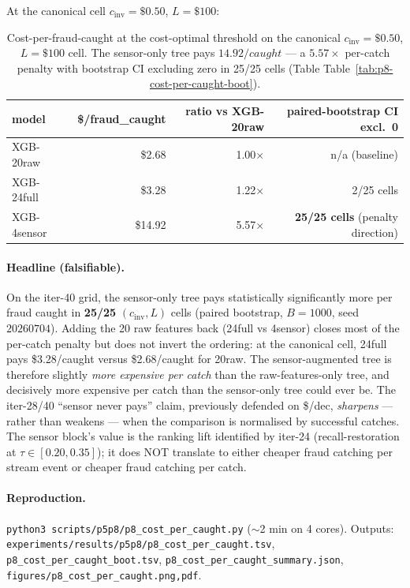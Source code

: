 \documentclass{article}
\providecommand{\tableref}[1]{Table~\ref{#1}}
\begin{document}
At the canonical cell $c_\text{inv}{=}\$0.50$, $L{=}\$100$:

\begin{table}[h]
\centering\small
\caption{Cost-per-fraud-caught at the cost-optimal threshold on the
canonical $c_\text{inv}{=}\$0.50$, $L{=}\$100$ cell. The sensor-only
tree pays $14.92/caught$ --- a $5.57\times$ per-catch penalty with
bootstrap CI excluding zero in 25/25 cells (Table
\tableref{tab:p8-cost-per-caught-boot}).}
\label{tab:p8-cost-per-caught}
\begin{tabular}{lrrr}
\toprule
model & \$/fraud\_caught & ratio vs XGB-20raw & paired-bootstrap CI excl.\ 0 \\
\midrule
XGB-20raw       & \$2.68  & 1.00$\times$ & n/a (baseline) \\
XGB-24full      & \$3.28  & 1.22$\times$ & 2/25 cells \\
XGB-4sensor     & \$14.92 & 5.57$\times$ & \textbf{25/25 cells} (penalty direction) \\
\bottomrule
\end{tabular}
\end{table}

\paragraph{Headline (falsifiable).}
On the iter-40 grid, the sensor-only tree pays statistically
significantly more per fraud caught in \textbf{25/25} $(c_\text{inv},
L)$ cells (paired bootstrap, $B{=}1000$, seed $20260704$). Adding
the 20 raw features back (24full vs 4sensor) closes most of the per-catch
penalty but does not invert the ordering: at the canonical cell,
24full pays \$3.28/caught versus \$2.68/caught for 20raw. The
sensor-augmented tree is therefore slightly \emph{more expensive per
catch} than the raw-features-only tree, and decisively more
expensive per catch than the sensor-only tree could ever be. The
iter-28/40 ``sensor never pays'' claim, previously defended on
\$/dec, \emph{sharpens} --- rather than weakens --- when the
comparison is normalised by successful catches. The sensor block's
value is the ranking lift identified by iter-24 (recall-restoration
at $\tau \in [0.20, 0.35]$); it does NOT translate to either cheaper
fraud catching per stream event or cheaper fraud catching per
catch.

\paragraph{Reproduction.}
\texttt{python3 scripts/p5p8/p8\_cost\_per\_caught.py}
($\sim$2 min on 4 cores). Outputs:
\texttt{experiments/results/p5p8/p8\_cost\_per\_caught.tsv},
\texttt{p8\_cost\_per\_caught\_boot.tsv},
\texttt{p8\_cost\_per\_caught\_summary.json},
\texttt{figures/p8\_cost\_per\_caught.{png,pdf}}.
\end{document}
